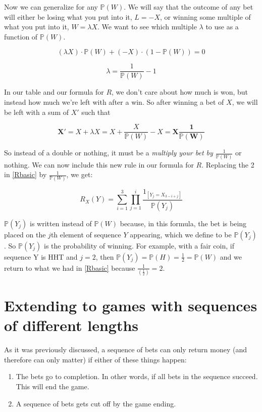 \documentclass[english,12pt,a4paper,final]{article}
\begin{document}
Now we can generalize for any $\mathbb{P}(W)$. We will say that the outcome of any bet will either be losing what you put into it, $L=-X$, or winning some multiple of what you put into it, $W=\lambda X$. We want to see which multiple $\lambda$ to use as a function of $\mathbb{P}(W)$.

\begin{equation*}
	(\lambda X) \cdot \mathbb{P}(W) + (-X) \cdot (1-\mathbb{P}(W)) = 0
\end{equation*}

\begin{equation*}
	\lambda = \frac{1}{\mathbb{P}(W)} - 1
\end{equation*}

In our table and our formula for $R$, we don't care about how much is won, but instead how much we're left with after a win. So after winning a bet of $X$, we will be left with a sum of $X'$ such that

\begin{equation*}
	\mathbf{X'} = X + \lambda X = X + \frac{X}{\mathbb{P}(W)} - X = \mathbf{X\frac{1}{\mathbb{P}(W)}}
\end{equation*}

So instead of a double or nothing, it must be a \textit{multiply your bet by $\frac{1}{\mathbb{P}(W)}$} or nothing. We can now include this new rule in our formula for $R$. Replacing the 2 in \eqref{Rbasic} by $\frac{1}{\mathbb{P}(W)}$, we get:

\begin{equation}\label{RanyRandom}
	R_X(Y) = \sum_{i=1}^{3} \prod_{j=1}^{i} \frac{1_{[Y_j = X_{3-i+j}]}}{\mathbb{P}(Y_j)}
\end{equation}

$\mathbb{P}(Y_j)$ is written instead of $\mathbb{P}(W)$ because, in this formula, the bet is being placed on the $j$th element of sequence $Y$ appearing, which we define to be $\mathbb{P}(Y_j)$. So $\mathbb{P}(Y_j)$ is the probability of winning. For example, with a fair coin, if sequence Y is HHT and $j=2$, then $\mathbb{P}(Y_j) = \mathbb{P}(H) = \frac{1}{2} = \mathbb{P}(W)$ and we return to what we had in \eqref{Rbasic} because $\frac{1}{(\frac{1}{2})} = 2$.

\section{Extending to games with sequences of different lengths}

As it was previously discussed, a sequence of bets can only return money (and therefore can only matter) if either of these things happen:
\begin{enumerate}
	\item The bets go to completion. In other words, if all bets in the sequence succeed. This will end the game.
	\item A sequence of bets gets cut off by the game ending.
\end{enumerate}
\end{document}

